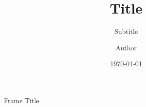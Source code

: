 \documentclass[
	aspectratio=169, %
	8pt, %
]{beamer}
\title[Short Title]{Title} %
\subtitle[Short Subtitle]{Subtitle} %
\author[Short Author]{Author} %
\date{\today} %
\begin{document}
\maketitle %

\begin{frame}{Frame Title}

\end{frame}
\end{document}
